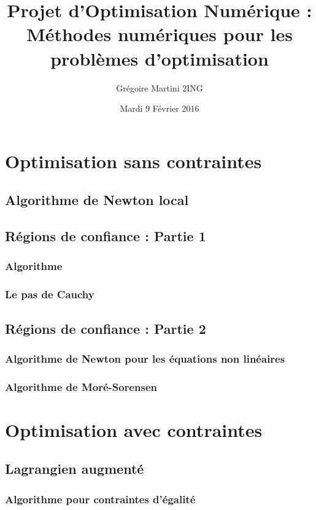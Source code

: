 \documentclass[a4paper,12pt]{article}
\title{Projet d'Optimisation Numérique : \\ \smallskip \Large Méthodes numériques pour les problèmes d'optimisation \\ \bigskip}
\author{Grégoire Martini 2ING}
\date{Mardi 9 Février 2016}
\begin{document}
\maketitle
\tableofcontents
\newpage

\section{Optimisation sans contraintes}

\subsection{Algorithme de Newton local}

\newpage
\subsection{Régions de confiance : Partie 1}
\subsubsection{Algorithme}
\subsubsection{Le pas de Cauchy}

\newpage
\subsection{Régions de confiance : Partie 2}
\subsubsection{Algorithme de Newton pour les équations non linéaires}
\subsubsection{Algorithme de Moré-Sorensen}

\newpage
\section{Optimisation avec contraintes}

\subsection{Lagrangien augmenté}
\subsubsection{Algorithme pour contraintes d'égalité}
\end{document}

